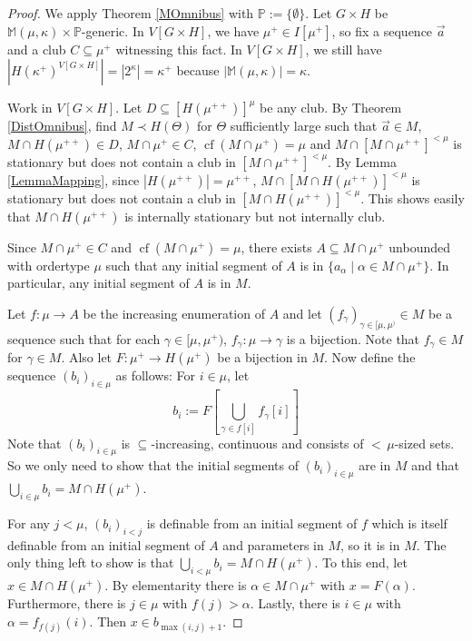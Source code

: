 \documentclass[a4paper]{amsart}
\theoremstyle{definition}
\theoremstyle{remark}
\theoremstyle{plain}
\numberwithin{mydef}{section}
\DeclareMathOperator{\cf}{cf}
\newcommand{\dM}{\mathbb{M}}
\newcommand{\dP}{\mathbb{P}}
\begin{document}
	\begin{proof}
		We apply Theorem \ref{MOmnibus} with $\dP:=\{\emptyset\}$. Let $G\times H$ be $\dM(\mu,\kappa)\times\dP$-generic. In $V[G\times H]$, we have $\mu^+\in I[\mu^+]$, so fix a sequence $\vec{a}$ and a club $C\subseteq\mu^+$ witnessing this fact. In $V[G\times H]$, we still have $|H(\kappa^+)^{V[G\times H]}|=|2^{\kappa}|=\kappa^+$ because $|\dM(\mu,\kappa)|=\kappa$.
		
		Work in $V[G\times H]$. Let $D\subseteq[H(\mu^{++})]^{\mu}$ be any club. By Theorem \ref{DistOmnibus}, find $M\prec H(\Theta)$ for $\Theta$ sufficiently large such that $\vec{a}\in M$, $M\cap H(\mu^{++})\in D$, $M\cap\mu^+\in C$, $\cf(M\cap\mu^+)=\mu$ and $M\cap[M\cap\mu^{++}]^{<\mu}$ is stationary but does not contain a club in $[M\cap\mu^{++}]^{<\mu}$. By Lemma \ref{LemmaMapping}, since $|H(\mu^{++})|=\mu^{++}$, $M\cap[M\cap H(\mu^{++})]^{<\mu}$ is stationary but does not contain a club in $[M\cap H(\mu^{++})]^{<\mu}$. This shows easily that $M\cap H(\mu^{++})$ is internally stationary but not internally club.
		
		Since $M\cap\mu^+\in C$ and $\cf(M\cap\mu^+)=\mu$, there exists $A\subseteq M\cap\mu^+$ unbounded with ordertype $\mu$ such that any initial segment of $A$ is in $\{a_{\alpha}\;|\;\alpha\in M\cap\mu^+\}$. In particular, any initial segment of $A$ is in $M$.
		
		Let $f\colon\mu\to A$ be the increasing enumeration of $A$ and let $(f_{\gamma})_{\gamma\in[\mu,\mu^)}\in M$ be a sequence such that for each $\gamma\in[\mu,\mu^+)$, $f_{\gamma}\colon\mu\to\gamma$ is a bijection. Note that $f_{\gamma}\in M$ for $\gamma\in M$. Also let $F\colon \mu^+\to H(\mu^+)$ be a bijection in $M$. Now define the sequence $(b_i)_{i\in\mu}$ as follows: For $i\in\mu$, let
		$$b_i:=F\left[\bigcup_{\gamma\in f[i]}f_{\gamma}[i]\right]$$
		Note that $(b_i)_{i\in\mu}$ is $\subseteq$-increasing, continuous and consists of ${<}\,\mu$-sized sets. So we only need to show that the initial segments of $(b_i)_{i\in\mu}$ are in $M$ and that $\bigcup_{i\in\mu}b_i=M\cap H(\mu^+)$.
		
		For any $j<\mu$, $(b_i)_{i<j}$ is definable from an initial segment of $f$ which is itself definable from an initial segment of $A$ and parameters in $M$, so it is in $M$. The only thing left to show is that $\bigcup_{i<\mu}b_i=M\cap H(\mu^+)$. To this end, let $x\in M\cap H(\mu^+)$. By elementarity there is $\alpha\in M\cap\mu^+$ with $x=F(\alpha)$. Furthermore, there is $j\in\mu$ with $f(j)>\alpha$. Lastly, there is $i\in\mu$ with $\alpha=f_{f(j)}(i)$. Then $x\in b_{\max(i,j)+1}$.
	\end{proof}
	
\end{document}
